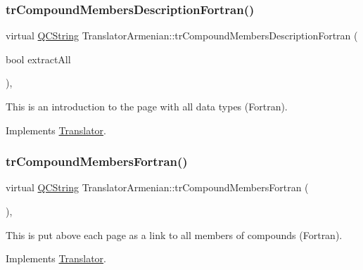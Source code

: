 \mbox{\label{class_translator_armenian_aba70f4624720f70213758420d4cdcf74}} 
\subsubsection{\texorpdfstring{trCompoundMembersDescriptionFortran()}{trCompoundMembersDescriptionFortran()}}
{\footnotesize\ttfamily virtual \mbox{\hyperlink{class_q_c_string}{Q\+C\+String}} Translator\+Armenian\+::tr\+Compound\+Members\+Description\+Fortran (\begin{DoxyParamCaption}\item[{bool}]{extract\+All }\end{DoxyParamCaption})\hspace{0.3cm}{\ttfamily [inline]}, {\ttfamily [virtual]}}

This is an introduction to the page with all data types (Fortran). 

Implements \mbox{\hyperlink{class_translator}{Translator}}.

\mbox{\label{class_translator_armenian_a7d205103e1200f1bc694fe4b29dc24c0}} 
\subsubsection{\texorpdfstring{trCompoundMembersFortran()}{trCompoundMembersFortran()}}
{\footnotesize\ttfamily virtual \mbox{\hyperlink{class_q_c_string}{Q\+C\+String}} Translator\+Armenian\+::tr\+Compound\+Members\+Fortran (\begin{DoxyParamCaption}{ }\end{DoxyParamCaption})\hspace{0.3cm}{\ttfamily [inline]}, {\ttfamily [virtual]}}

This is put above each page as a link to all members of compounds (Fortran). 

Implements \mbox{\hyperlink{class_translator}{Translator}}.

\mbox{\label{class_translator_armenian_a03a9075db86070c623bc4657f435e9b8}} 
